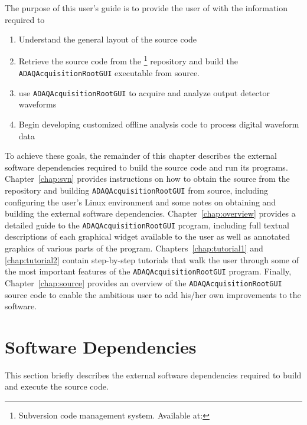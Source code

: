 The purpose of this user's guide is to provide the user of \ADAQ with
the information required to
\begin{enumerate}
  \item{Understand the general layout of the \ADAQ source code}
  \item{Retrieve the \ADAQ source code from the \GIT\footnote{Subversion
      code management system. Available at:
      } repository and build the
    \texttt{ADAQAcquisitionRootGUI} executable from source.}
  \item{use \texttt{ADAQAcquisitionRootGUI} to acquire and analyze output
    detector waveforms}
  \item{Begin developing customized offline analysis code to process
    digital waveform data}
\end{enumerate}

To achieve these goals, the remainder of this chapter describes the
external software dependencies required to build the \ADAQ source code
and run its programs. Chapter~\ref{chap:svn} provides instructions on
how to obtain the \ADAQ source from the \GIT repository and building
\texttt{ADAQAcquisitionRootGUI} from source, including configuring the user's
Linux environment and some notes on obtaining and building the
external software dependencies. Chapter~\ref{chap:overview} provides a
detailed guide to the \texttt{ADAQAcquisitionRootGUI} program, including full
textual descriptions of each graphical widget available to the user as
well as annotated graphics of various parts of the
program. Chapters~\ref{chap:tutorial1} and \ref{chap:tutorial2}
contain step-by-step tutorials that walk the user through some of the
most important features of the \texttt{ADAQAcquisitionRootGUI} program. Finally,
Chapter~\ref{chap:source} provides an overview of the
\texttt{ADAQAcquisitionRootGUI} source code to enable the ambitious user to add
his/her own improvements to the software.

    
\section{Software Dependencies}
\label{sec: dep}
This section briefly describes the external software dependencies
required to build and execute the \ADAQ source code.

